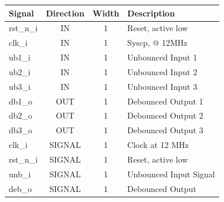 \documentclass[12pt,a4 paper] {report}
\begin{document}
\begin{center}
	\begin{tabular}{ | p{2cm} | c | c | p{5cm} |}
		\hline
		\textbf{Signal} & \textbf{Direction} & \textbf{Width} & \textbf{Description} \\
		\hline
		\hline
	  rst\_n\_i & IN & 1 & Reset, active low \\
	  \hline
		clk\_i & IN & 1 & Syscp, @ 12MHz \\
		\hline
		ub1\_i & IN & 1 & Unbounced Input 1 \\
		\hline
		ub2\_i & IN & 1 & Unbounced Input 2 \\
		\hline
		ub3\_i & IN & 1 & Unbounced Input 3 \\
		\hline
		db1\_o & OUT & 1 & Debounced Output 1 \\
		\hline
		db2\_o & OUT & 1 & Debounced Output 2 \\
		\hline
		db3\_o & OUT & 1 & Debounced Output 3 \\
		\hline
		\hline
		clk\_i & SIGNAL & 1 & Clock at 12 MHz\\
		\hline
		rst\_n\_i & SIGNAL & 1 & Reset, active low\\
		\hline
		unb\_i & SIGNAL & 1 & Unbounced Input Signal\\
		\hline
		deb\_o & SIGNAL & 1 & Debounced Output\\
		\hline
	\end{tabular}
\end{center}

\newpage
\end{document}
